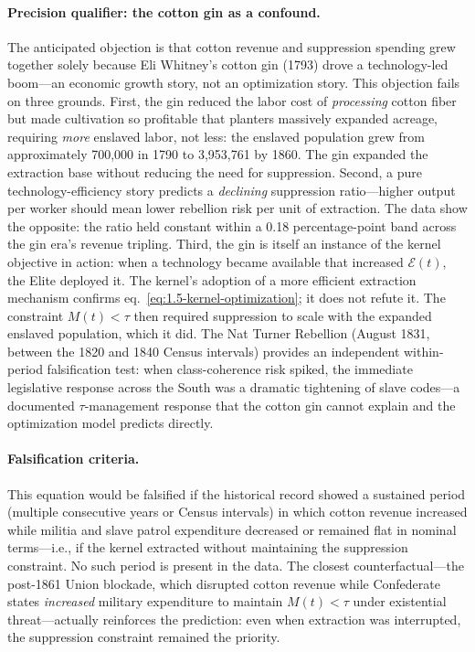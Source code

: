 \paragraph{Precision qualifier: the cotton gin as a confound.}
The anticipated objection is that cotton revenue and suppression spending grew together solely because Eli Whitney's cotton gin (1793) drove a technology-led boom---an economic growth story, not an optimization story. This objection fails on three grounds. First, the gin reduced the labor cost of \textit{processing} cotton fiber but made cultivation so profitable that planters massively expanded acreage, requiring \textit{more} enslaved labor, not less: the enslaved population grew from approximately 700,000 in 1790 to 3,953,761 by 1860. The gin expanded the extraction base without reducing the need for suppression. Second, a pure technology-efficiency story predicts a \textit{declining} suppression ratio---higher output per worker should mean lower rebellion risk per unit of extraction. The data show the opposite: the ratio held constant within a 0.18 percentage-point band across the gin era's revenue tripling. Third, the gin is itself an instance of the kernel objective in action: when a technology became available that increased $\mathcal{E}(t)$, the Elite deployed it. The kernel's adoption of a more efficient extraction mechanism confirms eq.~\ref{eq:1.5-kernel-optimization}; it does not refute it. The constraint $M(t) < \tau$ then required suppression to scale with the expanded enslaved population, which it did. The Nat Turner Rebellion (August 1831, between the 1820 and 1840 Census intervals) provides an independent within-period falsification test: when class-coherence risk spiked, the immediate legislative response across the South was a dramatic tightening of slave codes---a documented $\tau$-management response that the cotton gin cannot explain and the optimization model predicts directly.

\paragraph{Falsification criteria.}
This equation would be falsified if the historical record showed a sustained period (multiple consecutive years or Census intervals) in which cotton revenue increased while militia and slave patrol expenditure decreased or remained flat in nominal terms---i.e., if the kernel extracted without maintaining the suppression constraint. No such period is present in the data. The closest counterfactual---the post-1861 Union blockade, which disrupted cotton revenue while Confederate states \textit{increased} military expenditure to maintain $M(t) < \tau$ under existential threat---actually reinforces the prediction: even when extraction was interrupted, the suppression constraint remained the priority.

